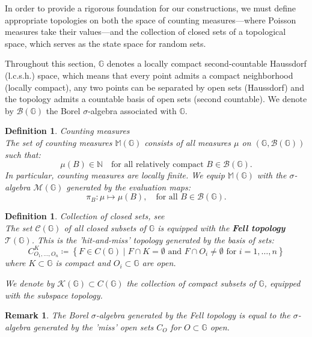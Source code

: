\documentclass{article} %
\newtheorem{definition}[theorem]{Definition}
\newtheorem{remark}[theorem]{Remark}
\newcommand{\1}{\mathbbm{1}} %
\begin{document}
\noindent In order to provide a rigorous foundation for our constructions, we must define appropriate topologies on both the space of counting measures—where Poisson measures take their values—and the collection of closed sets of a topological space, which serves as the state space for random sets.

Throughout this section, $\mathbb{G}$ denotes a locally compact second-countable Haussdorf (l.c.s.h.) space, which means that every point admits a compact neighborhood (locally compact), any two points can be separated by open sets (Haussdorf) and the topology admits a countable basis of open sets (second countable).
We denote by $\mathcal{B}(\mathbb{G})$ the Borel $\sigma$-algebra associated with $\mathbb{G}$.

\begin{definition}\textit{Counting measures}
    \leavevmode \\
    The set of counting measures $\mathbb{M}(\mathbb{G})$ consists of all measures $\mu$ on $(\mathbb{G}, \mathcal{B}(\mathbb{G}))$ such that:
    \[
    \mu(B) \in \mathbb{N} \quad \text{for all relatively compact } B \in \mathcal{B}(\mathbb{G}).
    \]
    In particular, counting measures are locally finite. We equip $\mathbb{M}(\mathbb{G})$ with the $\sigma$-algebra $\mathcal{M}(\mathbb{G})$ generated by the evaluation maps:
    \[
    \pi_B : \mu \mapsto \mu(B), \quad \text{for all } B \in \mathcal{B}(\mathbb{G}).
    \]
\end{definition}

\begin{definition}\textit{Collection of closed sets}, see \cite[Definition 5.1.1.]{TCCS}
    \leavevmode \\
    The set $\mathcal{C}(\mathbb{G})$ of all closed subsets of $\mathbb{G}$ is equipped with the \textbf{Fell topology} $\mathcal{T}(\mathbb{G})$. This is the 'hit-and-miss' topology generated by the basis of sets:
    \[
    C^K_{O_1, \dots, O_n} \coloneqq \left\{ F \in C(\mathbb{G}) \mid F \cap K = \emptyset \text{ and } F \cap O_i \neq \emptyset \text{ for } i=1, \dots, n \right\}
    \]
    where $K \subset \mathbb{G}$ is compact and $O_i \subset \mathbb{G}$ are open. 
    
    We denote by $\mathcal{K}(\mathbb{G}) \subset C(\mathbb{G})$ the collection of compact subsets of $\mathbb{G}$, equipped with the subspace topology.
\end{definition}

\begin{remark}
    The Borel $\sigma$-algebra generated by the Fell topology is equal to the $\sigma$-algebra generated by the 'miss' open sets $C_O$ for $O \subset \mathbb{G}$ open.
\end{remark}
\end{document}
